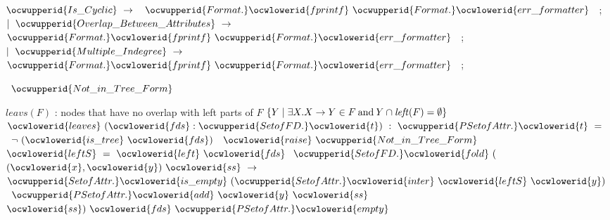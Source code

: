 \documentclass[12pt]{article}
\begin{document}
\ocwindent{3.00em}
$\ocwupperid{Is\_Cyclic}~\rightarrow{}~$\ocweol
\ocwindent{4.00em}
$\ocwupperid{Format.}\ocwlowerid{fprintf}~\ocwupperid{Format.}\ocwlowerid{err\_formatter}~$~;\ocweol
\ocwindent{4.00em}
\ocweol
\ocwindent{2.00em}
$\mid{}~\ocwupperid{Overlap\_Between\_Attributes}~\rightarrow{}$\ocweol
\ocwindent{4.00em}
$\ocwupperid{Format.}\ocwlowerid{fprintf}~\ocwupperid{Format.}\ocwlowerid{err\_formatter}~$~;\ocweol
\ocwindent{4.00em}
\ocweol
\ocwindent{2.00em}
$\mid{}~\ocwupperid{Multiple\_Indegree}~\rightarrow{}$\ocweol
\ocwindent{4.00em}
$\ocwupperid{Format.}\ocwlowerid{fprintf}~\ocwupperid{Format.}\ocwlowerid{err\_formatter}~$~;\ocweol
\ocwindent{4.00em}
\medskip

\label{rellens.ml:13120}%
\ocwindent{0.00em}
~$\ocwupperid{Not\_in\_Tree\_Form}$\medskip

\ocwendcode{}\ocwindent{0.00em}
$leavs(F)$ : nodes that have no overlap with left parts of $F$ 
\ocweol
\ocwindent{0.00em}
$\{ Y \mid \exists X.X\to Y\in F \mathbin{\text{and}} Y \cap \mathit{left}(F)=\emptyset \}$ 
\ocweol
\label{rellens.ml:13311}%
\medskip
\ocwbegincode{}\ocwindent{0.00em}
~$\ocwlowerid{leaves}~(\ocwlowerid{fds}:\ocwupperid{SetofFD.}\ocwlowerid{t})~:~\ocwupperid{PSetofAttr.}\ocwlowerid{t}~=$\ocweol
\ocwindent{1.50em}
~$\lnot{}~(\ocwlowerid{is\_tree}~\ocwlowerid{fds})~$~$\ocwlowerid{raise}~\ocwupperid{Not\_in\_Tree\_Form}~$\ocweol
\ocwindent{1.50em}
~$\ocwlowerid{leftS}~=~\ocwlowerid{left}~\ocwlowerid{fds}~$\ocweol
\ocwindent{1.50em}
$\ocwupperid{SetofFD.}\ocwlowerid{fold}~($~$(\ocwlowerid{x},\ocwlowerid{y})~\ocwlowerid{ss}~\rightarrow{}$\ocweol
\ocwindent{2.50em}
~$\ocwupperid{SetofAttr.}\ocwlowerid{is\_empty}~(\ocwupperid{SetofAttr.}\ocwlowerid{inter}~\ocwlowerid{leftS}~\ocwlowerid{y})~$\ocweol
\ocwindent{2.50em}
~$\ocwupperid{PSetofAttr.}\ocwlowerid{add}~\ocwlowerid{y}~\ocwlowerid{ss}~$\ocweol
\ocwindent{4.50em}
~$\ocwlowerid{ss})~\ocwlowerid{fds}~\ocwupperid{PSetofAttr.}\ocwlowerid{empty}$\medskip
\end{document}
